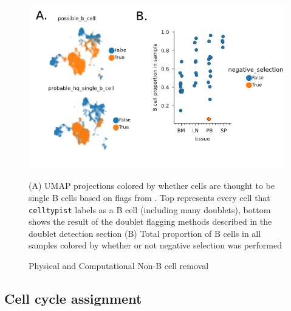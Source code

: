\begin{figure}[h]
    \centering
    \includegraphics[width=\textwidth]{figs/Tabula_Bursa/SI/SI_Bpurifi.pdf}
    \caption{Physical and Computational Non-B cell removal}{(A) UMAP projections colored by whether cells are thought to be single B cells based on flags from . Top represents every cell that \verb|celltypist| labels as a B cell (including many doublets), bottom shows the result of the doublet flagging methods described in the doublet detection section (B) Total proportion of B cells in all samples colored by whether or not negative selection was performed}
    \label{fig:B-filtering}
\end{figure}

\subsection{Cell cycle assignment}

